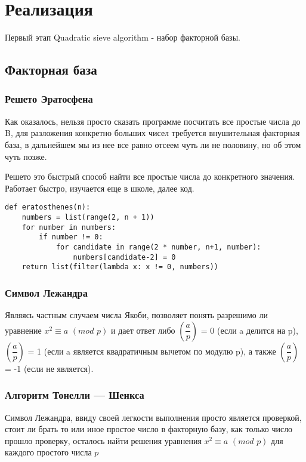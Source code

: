 \pagebreak

\section{Реализация}

Первый этап Quadratic sieve algorithm - набор факторной базы.

\subsection{Факторная база}

\subsubsection{Решето Эратосфена}

Как оказалось, нельзя просто сказать программе посчитать все простые числа до B, для разложения конкретно больших чисел требуется внушительная факторная база, в дальнейшем мы из нее все равно отсеем чуть ли не половину, но об этом чуть позже. 

Решето это быстрый способ найти все простые числа до конкретного значения. Работает быстро, изучается еще в школе, далее код.

\begin{lstlisting}
def eratosthenes(n):
    numbers = list(range(2, n + 1))
    for number in numbers:
        if number != 0:
            for candidate in range(2 * number, n+1, number):
                numbers[candidate-2] = 0
    return list(filter(lambda x: x != 0, numbers))
\end{lstlisting}

\subsubsection{Символ Лежандра}

Являясь частным случаем числа Якоби, позволяет понять разрешимо ли уравнение $x^2 \equiv a \,\,(mod \,\, p)$ и дает ответ либо $ \left( \dfrac{a}{p} \right)$ =  0 (если a делится на p),$ \left( \dfrac{a}{p} \right)$ =  1 (если a является квадратичным вычетом по модулю p), а также $ \left( \dfrac{a}{p} \right)$ = -1 (если не является).

\subsubsection{Алгоритм Тонелли — Шенкса}

Символ Лежандра, ввиду своей легкости выполнения просто является проверкой, стоит ли брать то или иное простое число в факторную базу, как только число прошло проверку, осталось найти решения уравнения $x^2 \equiv a \,\,(mod \,\, p)$ для каждого простого числа $p$

